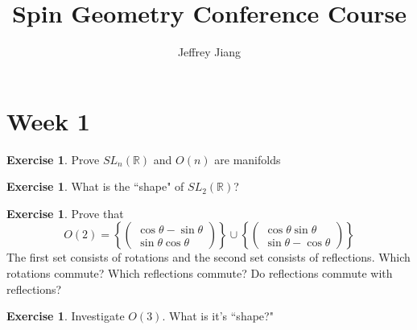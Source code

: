 \documentclass[psamsfonts]{amsart}
\theoremstyle{definition}
\newtheorem{exer}[thm]{Exercise}
\theoremstyle{remark}
\newcommand{\R}{\mathbb{R}}
\newcommand{\set}[1]{\left\lbrace #1 \right\rbrace}
\begin{document}
\author{Jeffrey Jiang}
\title{Spin Geometry Conference Course}
\maketitle
%
\setcounter{section}{1}
\section*{Week 1}
%
\begin{exer}
Prove $SL_n(\R)$ and $O(n)$ are manifolds
\end{exer}
%
\begin{exer}
What is the ``shape" of $SL_2(\R)$?
\end{exer}
%
\begin{exer}
Prove that
$$O(2) = \set{\begin{pmatrix}
\cos\theta -\sin\theta \\
\sin\theta \cos\theta
\end{pmatrix}} \cup \set{\begin{pmatrix}
\cos\theta \sin\theta \\
\sin\theta -\cos\theta 
\end{pmatrix}}$$
The first set consists of rotations and the second set consists of reflections. Which rotations commute? Which reflections commute? Do reflections commute with reflections?
\end{exer}
%
\begin{exer}
Investigate $O(3)$. What is it's ``shape?"
\end{exer}
%
\setcounter{section}{2}
%
\setcounter{thm}{0}
%
\end{document}
